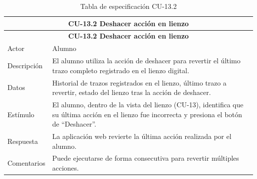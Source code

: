 \begin{longtable}{|p{4cm}|p{11cm}|}
\caption{Tabla de especificación CU-13.2}
\label{tab:cu13-2} \\

\hline
\multicolumn{2}{|c|}{\textbf{CU-13.2 Deshacer acción en lienzo}} \\
\hline
\endfirsthead

\hline
\multicolumn{2}{|c|}{\textbf{CU-13.2 Deshacer acción en lienzo}} \\
\hline
\endhead

\hline
\endfoot
\endlastfoot

Actor & Alumno \\
\hline

Descripción & El alumno utiliza la acción de deshacer para revertir el último trazo completo registrado en el lienzo digital. \\
\hline

Datos & Historial de trazos registrados en el lienzo, último trazo a revertir, estado del lienzo tras la acción de deshacer. \\
\hline

Estímulo & El alumno, dentro de la vista del lienzo (CU-13), identifica que su última acción en el lienzo fue incorrecta y presiona el botón de “Deshacer”. \\
\hline

Respuesta & La aplicación web revierte la última acción realizada por el alumno. \\
\hline

Comentarios & Puede ejecutarse de forma consecutiva para revertir múltiples acciones. \\
\hline

\end{longtable}


